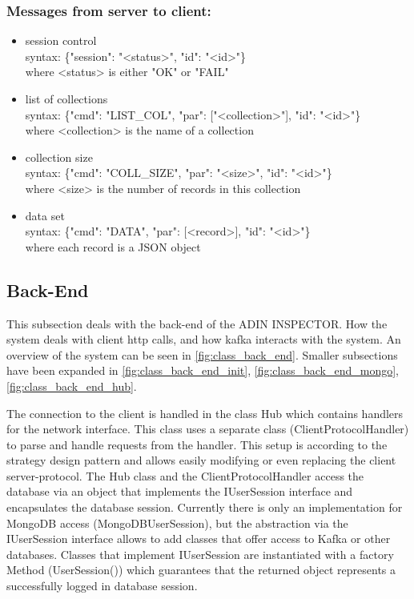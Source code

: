 \documentclass[oneside, english, final]{design}
\begin{document}
\subsubsection{Messages from server to client:}
\begin{itemize}
	\item{session control}
	      \\
	      syntax: \{"session": "<status>", "id": "<id>"\} \\
	      where <status> is either "OK" or "FAIL"\\

	\item{list of collections}
	      \\
	      syntax: \{"cmd": "LIST\_COL", "par": ["<collection>"], "id": "<id>"\} \\
	      where <collection> is the name of a collection\\

	\item{collection size}
	      \\
	      syntax: \{"cmd": "COLL\_SIZE", "par": "<size>", "id": "<id>"\} \\
	      where <size> is the number of records in this collection\\
	\item{data set}
	      \\
	      syntax: \{"cmd": "DATA", "par": [<record>], "id": "<id>"\} \\
	      where each record is a JSON object
\end{itemize}

\subsection{Back-End}
This subsection deals with the back-end of the ADIN INSPECTOR. How the system deals with client http calls, and how kafka interacts with the system.
An overview of the system can be seen in \autoref{fig:class_back_end}. Smaller subsections have been expanded in \autoref{fig:class_back_end_init}, \autoref{fig:class_back_end_mongo}, \autoref{fig:class_back_end_hub}.

The connection to the client is handled in the class Hub which contains handlers for the network interface. This class uses a separate class (ClientProtocolHandler) to parse and handle requests from the handler. This setup is according to the strategy design pattern and allows easily modifying or even replacing the client server-protocol.
The Hub class and the ClientProtocolHandler access the database via an object that implements the IUserSession interface and encapsulates the database session. Currently there is only an implementation for MongoDB access (MongoDBUserSession), but the abstraction via the IUserSession interface allows to add classes that offer access to Kafka or other databases.
Classes that implement IUserSession are instantiated with a factory Method (UserSession()) which guarantees that the returned object represents a successfully logged in database session.
\end{document}
